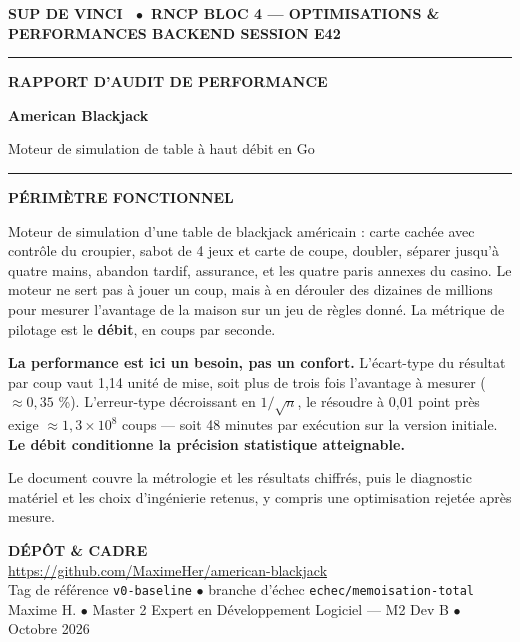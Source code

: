 \documentclass[10pt,a4paper]{article}
\newenvironment{keybox}
  {\begin{lrbox}{\keyboxbuf}%
   \begin{minipage}{\dimexpr\textwidth-16pt}\small\color{ink}\setlength{\parskip}{3pt}}
  {\end{minipage}\end{lrbox}%
   \setlength{\fboxsep}{8pt}\noindent\colorbox{accentlight}{\usebox{\keyboxbuf}}}
\newcommand{\code}[1]{\texttt{\small #1}}
\begin{document}
\thispagestyle{empty}

{\footnotesize\color{accent}\bfseries SUP DE VINCI \ $\bullet$\ RNCP BLOC 4 — OPTIMISATIONS \& PERFORMANCES BACKEND
\hfill SESSION E42}\\[-4pt]
{\color{accent}\rule{\textwidth}{1.2pt}}

\vspace{56mm}

{\footnotesize\color{accent}\bfseries RAPPORT D'AUDIT DE PERFORMANCE}

\vspace{2mm}
{\color{ink}\fontsize{36}{40}\selectfont\bfseries American Blackjack}

\vspace{1.5mm}
{\color{ink}\large Moteur de simulation de table à haut débit en Go}

\vspace{3mm}
{\color{accent}\rule{32mm}{2pt}}

\vspace{9mm}

\begin{keybox}
{\color{accent}\bfseries\footnotesize PÉRIMÈTRE FONCTIONNEL}

Moteur de simulation d'une table de blackjack américain : carte cachée avec contrôle du
croupier, sabot de 4 jeux et carte de coupe, doubler, séparer jusqu'à quatre mains,
abandon tardif, assurance, et les quatre paris annexes du casino. Le moteur ne sert pas
à jouer un coup, mais à en dérouler des dizaines de millions pour mesurer l'avantage de
la maison sur un jeu de règles donné. La métrique de pilotage est le \textbf{débit}, en
coups par seconde.

\textbf{La performance est ici un besoin, pas un confort.} L'écart-type du résultat par
coup vaut 1,14 unité de mise, soit plus de trois fois l'avantage à mesurer
($\approx 0{,}35$ \%). L'erreur-type décroissant en $1/\sqrt{n}$, le résoudre à 0,01
point près exige $\approx 1{,}3\times10^{8}$ coups — soit 48 minutes par exécution sur
la version initiale. \textbf{Le débit conditionne la précision statistique atteignable.}

Le document couvre la métrologie et les résultats chiffrés, puis le diagnostic matériel
et les choix d'ingénierie retenus, y compris une optimisation rejetée après mesure.
\end{keybox}

\vfill

\begin{center}
{\color{accent}\bfseries\footnotesize DÉPÔT \& CADRE}\\[2pt]
{\small\url{https://github.com/MaximeHer/american-blackjack}}\\[1pt]
{\footnotesize\color{muted}Tag de référence \code{v0-baseline} $\bullet$ branche d'échec \code{echec/memoisation-total}}\\[5pt]
{\footnotesize Maxime H. $\bullet$ Master 2 Expert en Développement Logiciel — M2 Dev B $\bullet$ Octobre 2026}
\end{center}
\end{document}
